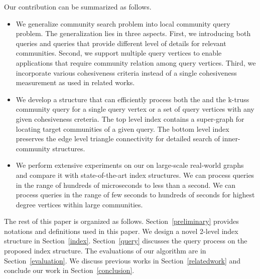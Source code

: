 Our contribution can be summarized as follows.
\begin{itemize}
	\item We generalize community search problem into local community query problem. The generalization lies in three aspects. First, we introducing both \toplevelprob{} queries and \bottomlevelprob{} queries that provide different level of details for relevant communities. Second, we support multiple query vertices to enable applications that require community relation among query vertices. Third, we incorporate various cohesiveness criteria instead of a single cohesiveness measurement as used in related works.
	\item We develop a \twolevelindex{} structure that can efficiently process both the \toplevelprob{} and the \bottomlevelprob{} k-truss community query for a single query vertex or a set of query vertices with any given cohesiveness creteria. The top level index contains a super-graph for locating target communities of a given query. The bottom level index preserves the edge level triangle connectivity for detailed search of inner-community structures.  
	\item We perform extensive experiments on our \twolevelindex{} on large-scale real-world graphs and compare it with state-of-the-art index structures. We can process \toplevelprob{} queries in the range of hundreds of microseconds to less than a second. We can process \bottomlevelprob{} queries in the range of few seconds to hundreds of seconds for highest degree vertices within large communities. %
\end{itemize}

The rest of this paper is organized as follows. Section~\ref{preliminary} provides notations and definitions used in this paper. We design a novel 2-level index structure in Section~\ref{index}. Section~\ref{query} discusses the query process on the proposed index structure. The evaluations of our algorithm are in Section~\ref{evaluation}.  We discuss previous works in Section~\ref{relatedwork} and conclude our work in Section~\ref{conclusion}.

